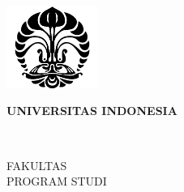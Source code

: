 \begin{titlepage}
    \begin{center}
        \includegraphics[width=3cm]{gambar/logo ui hitam.png}
        
        \bfseries
        UNIVERSITAS INDONESIA

        \vspace{1cm}
        \large 
        \MakeUppercase{\judul}

        \vspace{4cm}
        
        \MakeUppercase{\jenis}

        \vspace{4cm}
        \normalsize
        \MakeUppercase{\nama}\\
        \npm

        \vspace{5cm}
        FAKULTAS \MakeUppercase{\fakultas}\\
        PROGRAM STUDI \MakeUppercase{\prodi}\\
        \MakeUppercase{\tempat}\\
        \MakeUppercase{\bulan} \tahun
    \end{center}
    \normalfont
\end{titlepage}